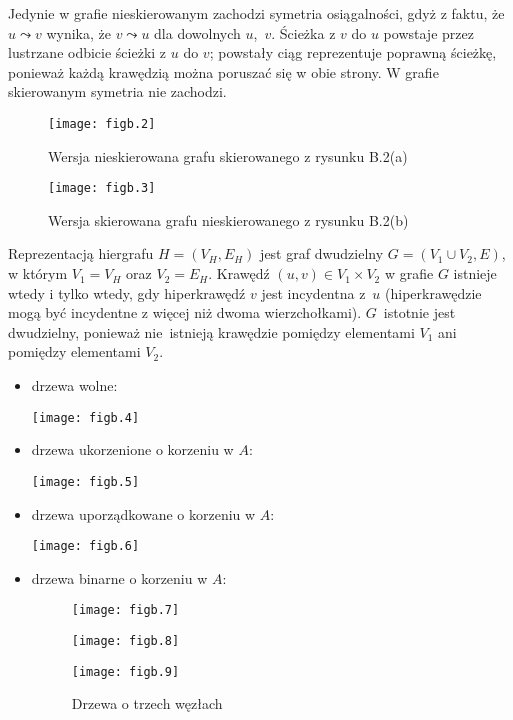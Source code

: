 Jedynie w grafie nieskierowanym zachodzi symetria osiągalności, gdyż z faktu, że $u\leadsto v$ wynika, że $v\leadsto u$ dla dowolnych $u$,~$v$. Ścieżka z $v$ do $u$ powstaje przez lustrzane odbicie ścieżki z $u$ do $v$; powstały ciąg reprezentuje poprawną ścieżkę, ponieważ każdą krawędzią można poruszać się w obie strony. W grafie skierowanym symetria nie zachodzi.

\exercise{} %
\begin{figure}[ht]
	\begin{center}
		\texttt{[image: figb.2]}
	\end{center}
	\caption{Wersja nieskierowana grafu skierowanego z rysunku B.2(a)}
\end{figure}
\begin{figure}[ht]
	\begin{center}
		\texttt{[image: figb.3]}
	\end{center}
	\caption{Wersja skierowana grafu nieskierowanego z rysunku B.2(b)}
\end{figure}

\exercise{} %
Reprezentacją hiergrafu $H=(V_H,E_H)$ jest graf dwudzielny $G=(V_1\cup V_2,E)$, w którym $V_1=V_H$ oraz $V_2=E_H$. Krawędź $(u,v)\in V_1\times V_2$ w grafie $G$ istnieje wtedy i tylko wtedy, gdy hiperkrawędź $v$ jest incydentna z~$u$ (hiperkrawędzie mogą być incydentne z więcej niż dwoma wierzchołkami). $G$~istotnie jest dwudzielny, ponieważ nie~istnieją krawędzie pomiędzy elementami $V_1$ ani pomiędzy elementami $V_2$.


\exercise{} %
\begin{itemize}
	\item drzewa wolne:
	\begin{center}
		\texttt{[image: figb.4]}
	\end{center}
	\item drzewa ukorzenione o korzeniu w $A$:
	\begin{center}
		\texttt{[image: figb.5]}
	\end{center}
	\item drzewa uporządkowane o korzeniu w $A$:
	\begin{center}
		\texttt{[image: figb.6]}
	\end{center}
	\item drzewa binarne o korzeniu w $A$:
	\begin{figure}[ht]
		\begin{center}
			\texttt{[image: figb.7]}
		\end{center}
		\begin{center}
			\texttt{[image: figb.8]}
		\end{center}
		\begin{center}
			\texttt{[image: figb.9]}
		\end{center}
		\caption{Drzewa o trzech węzłach}
	\end{figure}
\end{itemize}


